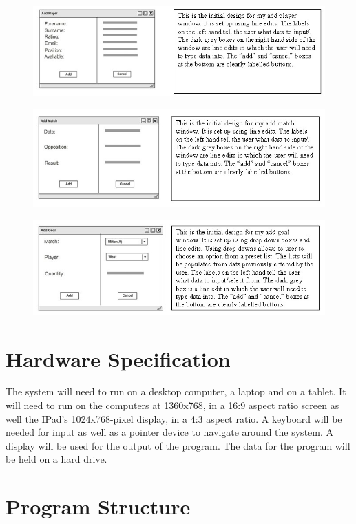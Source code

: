 \begin{figure}[H]
	\includegraphics[width=150mm]{addPlayerUifTxt}
\end{figure}
\begin{figure}[H]
	\includegraphics[width=150mm]{addMatchUifTxt}
\end{figure}
\begin{figure}[H]
	\includegraphics[width=150mm]{addGoalUifTxt}
\end{figure}
\section{Hardware Specification}
The system will need to run on a desktop computer, a laptop and on a tablet. It will need to run on the computers at 1360x768, in a 16:9 aspect ratio screen as well the IPad's 1024x768-pixel display, in a 4:3 aspect ratio. A keyboard will be needed for input as well as a pointer device to navigate around the system. A display will be used for the output of the program. The data for the program will be held on a hard drive.
\section{Program Structure}

